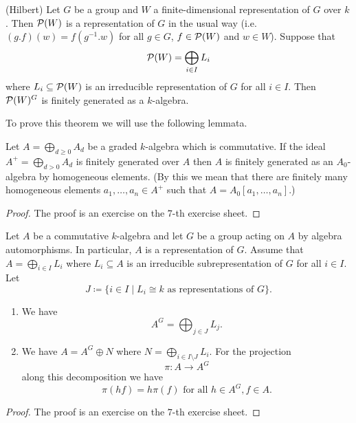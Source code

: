 \begin{thrm}(Hilbert)
  Let $G$ be a group and $W$ a finite-dimensional representation of $G$ over $k$. Then $\mathcal{P}(W)$ is a representation of $G$ in the usual way (i.e.\ $(g.f)(w) = f\left(g^{-1}.w\right)$ for all $g \in G$, $f \in \mathcal{P}(W)$ and $w \in W$). Suppose that
  \[
    \mathcal{P}(W) = \bigoplus_{i \in I} L_i
  \]
  where $L_i \subseteq \mathcal{P}(W)$ is an irreducible representation of $G$ for all $i \in I$. Then $\mathcal{P}(W)^G$ is finitely generated as a $k$-algebra.
\end{thrm}


To prove this theorem we will use the following lemmata.


\begin{lem}\label{lem: technical lemma about generating}
  Let $A = \bigoplus_{d \geq 0} A_d$ be a graded $k$-algebra which is commutative. If the ideal $A^+ = \bigoplus_{d > 0} A_d$ is finitely generated over $A$ then $A$ is finitely generated as an $A_0$-algebra by homogeneous elements. (By this we mean that there are finitely many homogeneous elements $a_1, \dotsc, a_n \in A^+$ such that $A = A_0[a_1, \dotsc, a_n]$.)
\end{lem}
\begin{proof}
  The proof is an exercise on the $7$-th exercise sheet.
\end{proof}


\begin{lem}\label{lem: projection reynold operator}
  Let $A$ be a commutative $k$-algebra and let $G$ be a group acting on $A$ by algebra automorphisms. In particular, $A$ is a representation of $G$. Assume that $A = \bigoplus_{i \in I} L_i$ where $L_i \subseteq A$ is an irreducible subrepresentation of $G$ for all $i \in I$. Let
  \[
    J \coloneqq \{i \in I \mid L_i \cong k \text{ as representations of $G$}\}.
  \]
  \begin{enumerate}[label=\emph{\alph*)},leftmargin=*]
    \item
      We have
      \[
        A^G = \bigoplus_{j \in J} L_j.
      \]
    \item
      We have $A = A^G \oplus N$ where $N = \bigoplus_{i \in I \setminus J} L_i$. For the projection
      \[
        \pi \colon A \to A^G
      \]
      along this decomposition we have
      \[
        \pi(hf) = h\pi(f) \text{ for all } h \in A^G, f \in A.
      \]
  \end{enumerate}
\end{lem}
\begin{proof}
  The proof is an exercise on the $7$-th exercise sheet.
\end{proof}


